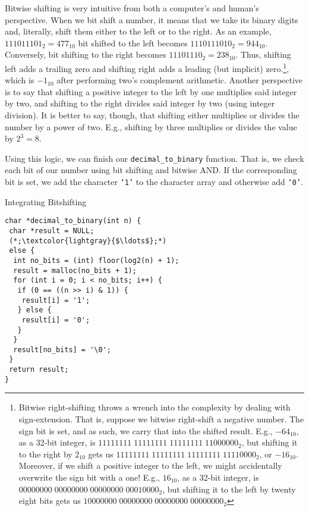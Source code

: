 Bitwise shifting is very intuitive from both a computer's and human's perspective. When we bit shift a number, it means that we take its binary digits and, literally, shift them either to the left or to the right. As an example, $111011101_{2}=477_{10}$ bit shifted to the left becomes $1110111010_{2}=944_{10}$. Conversely, bit shifting to the right becomes $11101110_{2}=238_{10}$. Thus, shifting left adds a trailing zero and shifting right adds a leading (but implicit) zero.\footnote{Bitwise right-shifting throws a wrench into the complexity by dealing with sign-extension. That is, suppose we bitwise right-shift a negative number. The sign bit is set, and as such, we carry that into the shifted result. E.g., $-64_{10}$, as a 32-bit integer, is $11111111\;11111111\;11111111\;11000000_{2}$, but shifting it to the right by $2_{10}$ gets us $11111111\;11111111\;11111111\;11110000_{2}$, or $-16_{10}$. Moreover, if we shift a positive integer to the left, we might accidentally overwrite the sign bit with a one! E.g., $16_{10}$, as a 32-bit integer, is $00000000\;00000000\;00000000\;00010000_{2}$, but shifting it to the left by twenty eight bits gets us $10000000\;00000000\;00000000\;00000000_{2}$}, which is $-1_{10}$ after performing two's complement arithmetic. Another perspective is to say that shifting a positive integer to the left by one multiplies said integer by two, and shifting to the right divides said integer by two (using integer division). It is better to say, though, that shifting either multiplies or divides the number by a power of two. E.g., shifting by three multiplies or divides the value by $2^{3}=8$.

Using this logic, we can finish our \texttt{decimal\_to\_binary} function. That is, we check each bit of our number using bit shifting and bitwise AND. If the corresponding bit is set, we add the character \texttt{`1'} to the character array and otherwise add \texttt{`0'}.

\begin{cl}[main.c]{Integrating Bitshifting}\begin{lstlisting}[language=MyC]
char *decimal_to_binary(int n) {
 char *result = NULL;
 (*;\textcolor{lightgray}{$\ldots$};*)
 else {
  int no_bits = (int) floor(log2(n) + 1);
  result = malloc(no_bits + 1);
  for (int i = 0; i < no_bits; i++) {
   if (0 == ((n >> i) & 1)) {
    result[i] = '1';
   } else {
    result[i] = '0';
   }
  }
  result[no_bits] = '\0';
 }
 return result;
}   
\end{lstlisting}\end{cl}

